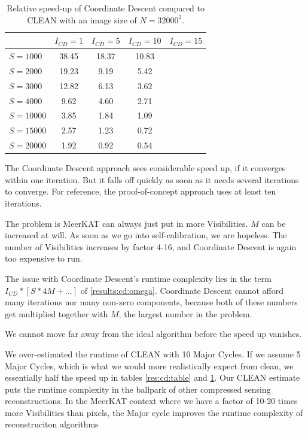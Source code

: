 \begin{table}[h!]
	\begin{center}
		\begin{tabular}{l|c|c|c|c} %
			& $I_{CD} = 1$ & $I_{CD} = 5$ &  $I_{CD} = 10$ &  $I_{CD} = 15$\\
			\hline
			$S=1000$ & 38.45 & 18.37 & 10.83 & \\
			$S=2000$ & 19.23 & 9.19 & 5.42 &  \\
			$S=3000$ & 12.82 & 6.13 & 3.62 &  \\
			$S=4000$ & 9.62 & 4.60 & 2.71 & \\
			\hline
			$S=10000$ & 3.85 & 1.84 & 1.09 &  \\
			$S=15000$ & 2.57 & 1.23 & 0.72 & \\
			$S=20000$ & 1.92 & 0.92 & 0.54 & \\
		\end{tabular}
		\caption{Relative speed-up of Coordinate Descent compared to CLEAN with an image size of $N=32000^2$. }
		\label{res:cd:large:table}
	\end{center}
\end{table}

The Coordinate Descent approach sees considerable speed up, if it converges within one iteration. But it falls off quickly as soon as it needs several iterations to converge. For reference, the proof-of-concept approach uses at least ten iterations. 

The problem is MeerKAT can always just put in more Visibilities. $M$ can be increased at will. As soon as we go into self-calibration, we are hopeless. The number of Visibilities increases by factor 4-16, and Coordinate Descent is again too expensive to run.

The issue with Coordinate Descent's runtime complexity lies in the term $I_{CD} * [S * 4M +\ldots]$ of \eqref{results:cd:omega}. Coordinate Descent cannot afford many iterations nor many non-zero components, because both of these numbers get multiplied together with $M$, the largest number in the problem.

We cannot move far away from the ideal algorithm before the speed up vanishes. 

We over-estimated the runtime of CLEAN with 10 Major Cycles. If we assume 5 Major Cycles, which is what we would more realistically expect from clean, we essentially half the speed up in tables \ref{res:cd:table} and \ref{res:cd:large:table}. Our CLEAN estimate puts the runtime complexity in the ballpark of other compressed sensing reconstructions.
In the MeerKAT context where we have a factor of 10-20 times more Visibilities than pixels, the Major cycle improves the runtime complexity of reconstruciton algorithms

